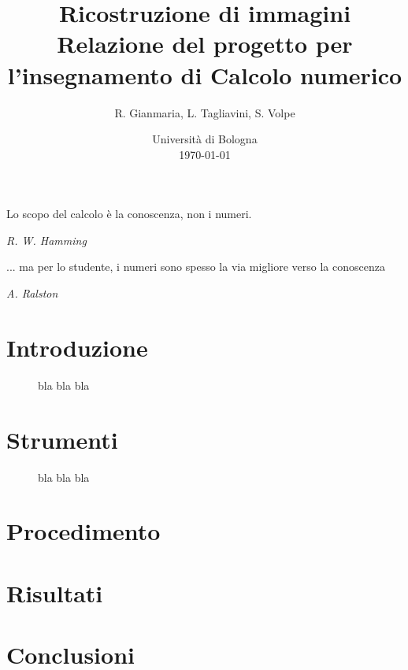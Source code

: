 \documentclass[a4paper]{article}
\title{Ricostruzione di immagini \\ \large Relazione del progetto per l'insegnamento di Calcolo numerico}
\author{
  R. Gianmaria,
  L. Tagliavini,
  S. Volpe
}
\date{
	Universit\`a di Bologna \\
  \today
}
\begin{document}
\maketitle
\thispagestyle{empty}

\epigraph{Lo scopo del calcolo è la conoscenza, non i numeri.}
{\textit{R. W. Hamming}}
\epigraph{... ma per lo studente, i numeri sono spesso la via migliore verso la
conoscenza}
{\textit{A. Ralston}}

\section{Introduzione}

\begin{figure}
    \begin{center}
        \scalebox{0.65}{}
    \end{center}
    \caption{bla bla bla}
\end{figure}

\section{Strumenti}

\begin{figure}
    \begin{center}
        \scalebox{0.65}{}
    \end{center}
    \begin{center}
        \scalebox{0.65}{}
    \end{center}
    \begin{center}
      \scalebox{0.65}{}
    \end{center}
    \caption{bla bla bla}
\end{figure}

\section{Procedimento}

\section{Risultati}

\section{Conclusioni}
\end{document}
